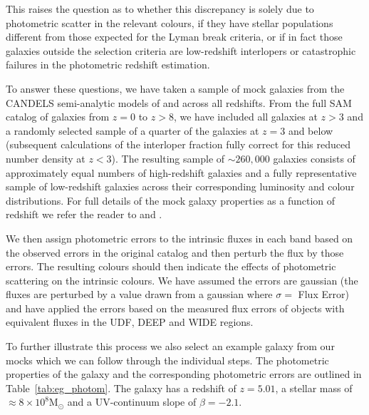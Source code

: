 This raises the question as to whether this discrepancy is solely due to photometric scatter in the relevant colours, if they have stellar populations different from those expected for the Lyman break criteria, or if in fact those galaxies outside the selection criteria are low-redshift interlopers or catastrophic failures in the photometric redshift estimation.

To answer these questions, we have taken a sample of mock galaxies from the CANDELS semi-analytic models of \citet{Somerville:2008ed} and \citet{Somerville:2012cq} across all redshifts. From the full SAM catalog of galaxies from $z = 0$ to $z > 8$, we have included all galaxies at $z > 3$ and a randomly selected sample of a quarter of the galaxies at $z = 3$ and below (subsequent calculations of the interloper fraction fully correct for this reduced number density at $z < 3$). The resulting sample of $\sim 260,000$ galaxies consists of approximately equal numbers of high-redshift galaxies and a fully representative sample of low-redshift galaxies across their corresponding luminosity and colour distributions. For full details of the mock galaxy properties as a function of redshift we refer the reader to \citet{Somerville:2008ed} and \citet{Lu:2013ui}.

We then assign photometric errors to the intrinsic fluxes in each band based on the observed errors in the original catalog and then perturb the flux by those errors. The resulting colours should then indicate the effects of photometric scattering on the intrinsic colours. We have assumed the errors are gaussian (the fluxes are perturbed by a value drawn from a gaussian where $\sigma =$ Flux Error) and have applied the errors based on the measured flux errors of objects with equivalent fluxes in the UDF, DEEP and WIDE regions. 

To further illustrate this process we also select an example galaxy from our mocks which we can follow through the individual steps. The photometric properties of the galaxy and the corresponding photometric errors are outlined in Table~\ref{tab:eg_photom}. The galaxy has a redshift of $z = 5.01$, a stellar mass of $\approx 8 \times 10^{8} \text{M}_{\odot}$ and a UV-continuum slope of $\beta = -2.1$.

